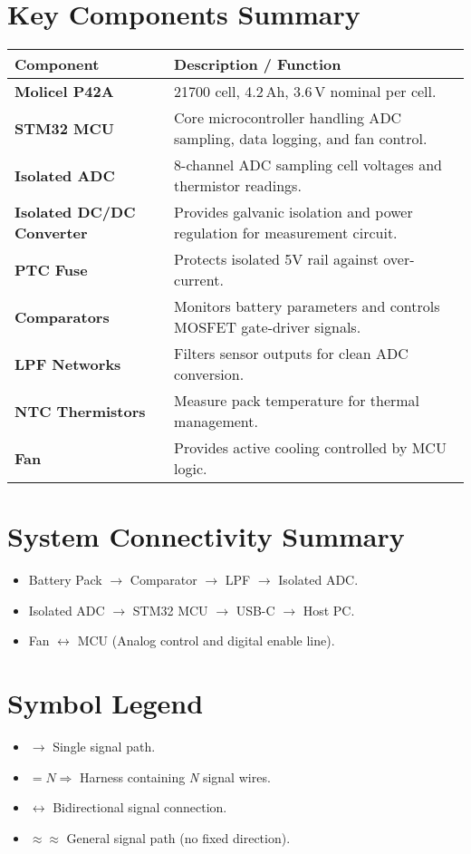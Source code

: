 \documentclass[12pt,a4paper]{article}
\begin{document}
\section{Key Components Summary}
\begin{table}[h!]
\centering
\renewcommand{\arraystretch}{1.2}
\begin{tabular}{@{} p{3.5cm} p{9cm} @{}}
\toprule
\textbf{Component} & \textbf{Description / Function} \\ \midrule
\textbf{Molicel P42A} & 21700 cell, 4.2\,Ah, 3.6\,V nominal per cell. \\
\textbf{STM32 MCU} & Core microcontroller handling ADC sampling, data logging, and fan control. \\
\textbf{Isolated ADC} & 8-channel ADC sampling cell voltages and thermistor readings. \\
\textbf{Isolated DC/DC Converter} & Provides galvanic isolation and power regulation for measurement circuit. \\
\textbf{PTC Fuse} & Protects isolated 5V rail against over-current. \\
\textbf{Comparators} & Monitors battery parameters and controls MOSFET gate-driver signals. \\
\textbf{LPF Networks} & Filters sensor outputs for clean ADC conversion. \\
\textbf{NTC Thermistors} & Measure pack temperature for thermal management. \\
\textbf{Fan} & Provides active cooling controlled by MCU logic. \\
\bottomrule
\end{tabular}
\end{table}

\section{System Connectivity Summary}
\begin{itemize}
    \item Battery Pack $\rightarrow$ Comparator $\rightarrow$ LPF $\rightarrow$ Isolated ADC.
    \item Isolated ADC $\rightarrow$ STM32 MCU $\rightarrow$ USB-C $\rightarrow$ Host PC.
    \item Fan $\leftrightarrow$ MCU (Analog control and digital enable line).
\end{itemize}

\section{Symbol Legend}
\begin{itemize}
    \item $\rightarrow$ Single signal path.
    \item $=N\Rightarrow$ Harness containing \textit{N} signal wires.
    \item $\leftrightarrow$ Bidirectional signal connection.
    \item $\approx\approx$ General signal path (no fixed direction).
\end{itemize}
\end{document}
